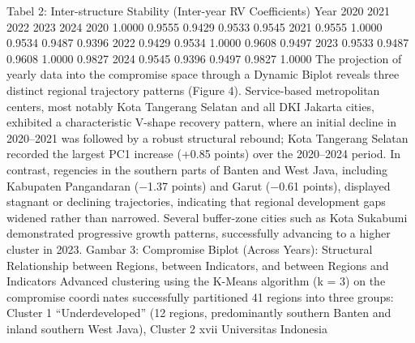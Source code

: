 Tabel 2: Inter-structure Stability (Inter-year RV Coefficients)
Year 2020 2021 2022 2023 2024
2020 1.0000 0.9555 0.9429 0.9533 0.9545
2021 0.9555 1.0000 0.9534 0.9487 0.9396
2022 0.9429 0.9534 1.0000 0.9608 0.9497
2023 0.9533 0.9487 0.9608 1.0000 0.9827
2024 0.9545 0.9396 0.9497 0.9827 1.0000
The projection of yearly data into the compromise space through a Dynamic Biplot
reveals three distinct regional trajectory patterns (Figure 4). Service-based metropolitan
centers, most notably Kota Tangerang Selatan and all DKI Jakarta cities, exhibited a
characteristic V-shape recovery pattern, where an initial decline in 2020–2021 was followed
by a robust structural rebound; Kota Tangerang Selatan recorded the largest PC1 increase
(+0.85 points) over the 2020–2024 period. In contrast, regencies in the southern parts of
Banten and West Java, including Kabupaten Pangandaran (−1.37 points) and Garut (−0.61
points), displayed stagnant or declining trajectories, indicating that regional development
gaps widened rather than narrowed. Several buffer-zone cities such as Kota Sukabumi
demonstrated progressive growth patterns, successfully advancing to a higher cluster in
2023.
Gambar 3: Compromise Biplot (Across Years): Structural Relationship between Regions,
between Indicators, and between Regions and Indicators
Advanced clustering using the K-Means algorithm (k = 3) on the compromise coordinates successfully partitioned 41 regions into three groups: Cluster 1 “Underdeveloped”
(12 regions, predominantly southern Banten and inland southern West Java), Cluster 2
xvii Universitas Indonesia

